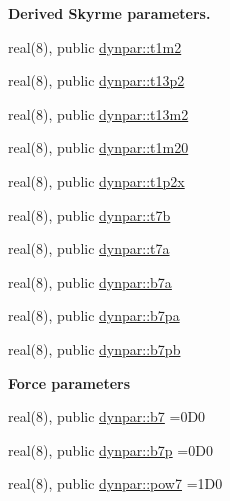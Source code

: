 \begin{Indent}{\bf Derived Skyrme parameters.}
\begin{DoxyCompactItemize}
real(8), public \hyperlink{namespacedynpar_a0b2a09851ee2793eb627728a2559c098}{dynpar\+::t1m2}
\item 
real(8), public \hyperlink{namespacedynpar_aa24c90fcf265f58d86dda06a8e3b4114}{dynpar\+::t13p2}
\item 
real(8), public \hyperlink{namespacedynpar_ab04204e630574c39eb93c4807ea96950}{dynpar\+::t13m2}
\item 
real(8), public \hyperlink{namespacedynpar_add6c411b3280d4e9eb751927a1f0d170}{dynpar\+::t1m20}
\item 
real(8), public \hyperlink{namespacedynpar_a9d9fe6f7b4326da8b18d74cca5e547df}{dynpar\+::t1p2x}
\item 
real(8), public \hyperlink{namespacedynpar_a854df581a7d115b4efe0c4b8c1ef2b2a}{dynpar\+::t7b}
\item 
real(8), public \hyperlink{namespacedynpar_abb0f2830794bbbf63ad3e66d51efd586}{dynpar\+::t7a}
\item 
real(8), public \hyperlink{namespacedynpar_a8ef7736a5a05040ea9ff5b58092f3da9}{dynpar\+::b7a}
\item 
real(8), public \hyperlink{namespacedynpar_a4ac29c0b2af112a5baa962972b7d4384}{dynpar\+::b7pa}
\item 
real(8), public \hyperlink{namespacedynpar_a51bcba5e99e6dce530692249dc71558e}{dynpar\+::b7pb}
\end{DoxyCompactItemize}
\end{Indent}
\begin{Indent}{\bf Force parameters}\par
\begin{DoxyCompactItemize}
\item 
real(8), public \hyperlink{namespacedynpar_a9ed3cf4b8f932ee2bc28104ec0b67e6c}{dynpar\+::b7} =0\+D0
\item 
real(8), public \hyperlink{namespacedynpar_a36d879245fe80ba1577658c7c1da1a1d}{dynpar\+::b7p} =0\+D0
\item 
real(8), public \hyperlink{namespacedynpar_a66a358da61845e6d07f37be5fd8e6f59}{dynpar\+::pow7} =1\+D0
\end{DoxyCompactItemize}
\end{Indent}
